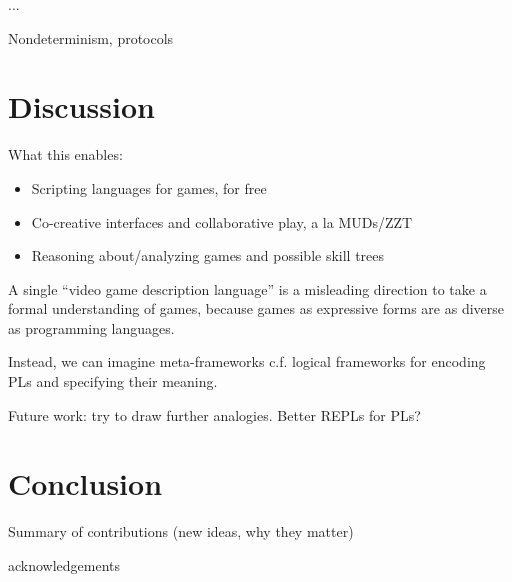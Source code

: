 \documentclass[sigconf]{acmart}
\begin{document}
...

Nondeterminism, protocols

\section{Discussion}

  What this enables:
  \begin{itemize}
  \item Scripting languages for games, for free
  \item Co-creative interfaces and collaborative play, a la MUDs/ZZT
  \item Reasoning about/analyzing games and possible skill trees
  \end{itemize}

  A single ``video game description language'' is a misleading direction to
  take a formal understanding of games, because games as expressive forms
  are as diverse as programming languages.

  Instead, we can imagine meta-frameworks c.f. logical frameworks for
  encoding PLs and specifying their meaning.

  Future work: try to draw further analogies. Better REPLs for PLs? 

\section{Conclusion}

  Summary of contributions (new ideas, why they matter)

\begin{acks}
  acknowledgements
\end{acks}

% 
%  
\end{document}
